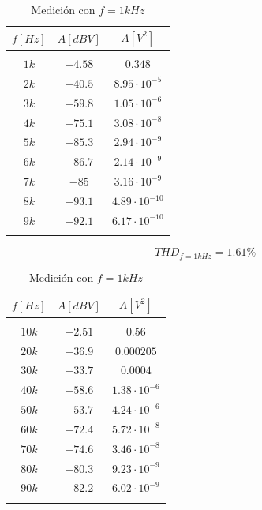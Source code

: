 \begin{table}[H]
    \centering
    \begin{tabular}{c c c}
        $f [Hz]$ & $A [dBV]$ & $A [V^{2}]$ \\
        \hline \\
        $1k$ & $-4.58$ & $0.348$ \\
        $2k$ & $-40.5$ & $8.95 \cdot 10^{-5}$ \\
        $3k$ & $-59.8$ & $1.05 \cdot 10^{-6}$ \\
        $4k$ & $-75.1$ & $3.08 \cdot 10^{-8}$ \\
        $5k$ & $-85.3$ & $2.94 \cdot 10^{-9}$ \\
        $6k$ & $-86.7$ & $2.14 \cdot 10^{-9}$ \\
        $7k$ & $-85$ & $3.16 \cdot 10^{-9}$ \\
        $8k$ & $-93.1$ & $4.89 \cdot 10^{-10}$ \\
        $9k$ & $-92.1$ & $6.17 \cdot 10^{-10}$ \\
        \hline \\
    \end{tabular}
    \caption{Medici\'on con $f = 1kHz$}
\end{table}

\begin{equation}
    THD_{f = 1kHz} = 1.61 \%
\end{equation}

\begin{table}[H]
    \centering
    \begin{tabular}{c c c}
        $f [Hz]$ & $A [dBV]$ & $A [V^{2}]$ \\
        \hline \\
        $10k$ & $-2.51$ & $0.56$ \\
        $20k$ & $-36.9$ & $0.000205$ \\
        $30k$ & $-33.7$ & $0.0004$ \\
        $40k$ & $-58.6$ & $1.38 \cdot 10^{-6}$ \\
        $50k$ & $-53.7$ & $4.24 \cdot 10^{-6}$ \\
        $60k$ & $-72.4$ & $5.72 \cdot 10^{-8}$ \\
        $70k$ & $-74.6$ & $3.46 \cdot 10^{-8}$ \\
        $80k$ & $-80.3$ & $9.23 \cdot 10^{-9}$ \\
        $90k$ & $-82.2$ & $6.02 \cdot 10^{-9}$ \\
        \hline \\
    \end{tabular}
    \caption{Medici\'on con $f = 1kHz$}
\end{table}

